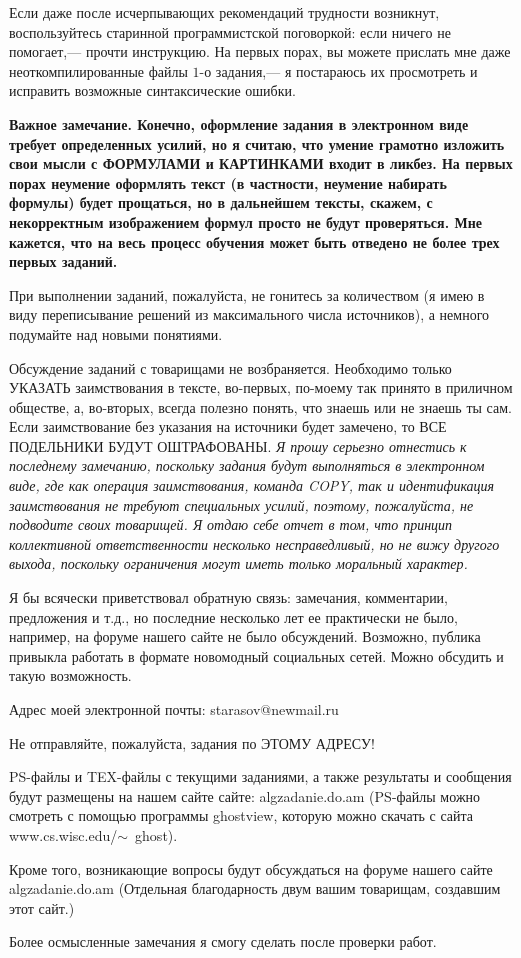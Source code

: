 \documentclass[10pt,twocolumn]{article}
\begin{document}
{Если даже после исчерпывающих рекомендаций трудности возникнут,
воспользуйтесь старинной программистской поговоркой: если ничего не помогает,--- прочти инструкцию.
На первых порах,  вы можете прислать мне даже
неоткомпилированные файлы $1$-о задания,--- я постараюсь их просмотреть и исправить возможные синтаксические
ошибки.

{\bf Важное замечание. Конечно, оформление задания в электронном виде требует определенных усилий, но я считаю, что 
умение грамотно изложить свои мысли с ФОРМУЛАМИ и КАРТИНКАМИ входит в ликбез. На первых порах неумение оформлять текст
(в частности, неумение набирать формулы) будет прощаться, но в дальнейшем тексты, скажем, с некорректным изображением формул просто не будут проверяться. Мне кажется,
что на весь процесс обучения может быть отведено не более трех первых заданий.}

При выполнении заданий, пожалуйста, не гонитесь за количеством (я имею
в виду переписывание решений из максимального числа источников), а
немного подумайте над новыми понятиями. 

Обсуждение заданий с товарищами не возбраняется. Необходимо
только УКАЗАТЬ заимствования в тексте, во-первых, по-моему так принято
в приличном обществе, а, во-вторых, всегда полезно понять, что знаешь
или не знаешь ты сам. Если заимствование без указания на источники
будет замечено, то  {\huge ВСЕ} ПОДЕЛЬНИКИ БУДУТ ОШТРАФОВАНЫ.
{\em Я прошу серьезно отнестись к последнему замечанию, поскольку  задания будут 
выполняться в электронном виде, где как операция заимствования, команда COPY,
так и идентификация заимствования не требуют специальных усилий, поэтому,
пожалуйста, не подводите своих товарищей.
Я отдаю себе отчет в том, что принцип коллективной ответственности несколько несправедливый, но не 
вижу другого выхода, поскольку ограничения могут иметь только моральный характер.}


Я бы всячески приветствовал обратную связь: замечания, комментарии,
предложения и т.д., но последние несколько лет ее практически не было, например, на форуме нашего
 сайте не было обсуждений. Возможно, публика привыкла работать в формате новомодный социальных сетей.
Можно обсудить и такую возможность.

Адрес моей электронной почты: starasov@newmail.ru

{\large Не отправляйте, пожалуйста,  задания по ЭТОМУ АДРЕСУ!}



PS-файлы и TEX-файлы с текущими заданиями, а также результаты и сообщения
будут размещены на нашем сайте сайте: algzadanie.do.am
(PS-файлы можно смотреть с помощью программы ghostview, которую можно
скачать с сайта www.cs.wisc.edu/$\sim$~ghost).

Кроме того, возникающие вопросы будут обсуждаться на форуме нашего сайте
algzadanie.do.am
(Отдельная благодарность двум вашим товарищам, создавшим этот сайт.)

Более осмысленные замечания я смогу сделать после проверки работ.}
\end{document}
